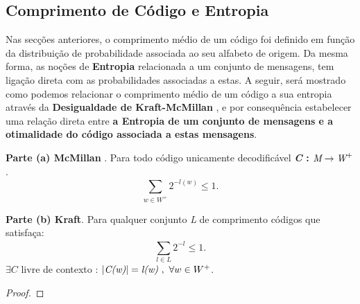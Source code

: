 \subsection{Comprimento de Código e Entropia}
Nas secções anteriores, o comprimento médio de um código  foi definido em função da distribuição de probabilidade associada ao seu alfabeto de origem.
Da mesma forma, as noções de \textbf{Entropia} relacionada a um conjunto de mensagens, tem ligação direta com as probabilidades associadas a estas. 
A seguir, será mostrado como podemos relacionar o comprimento médio de um código a sua entropia através da \textbf{Desigualdade de Kraft-McMillan} , e por consequência estabelecer uma relação direta entre \textbf{a Entropia de um conjunto de mensagens e a otimalidade do código associada a estas mensagens}.

\begin{lemma}  \textbf{Parte (a) McMillan} . Para todo código unicamente decodificável \textbf{\emph{C} : $\emph{M} \rightarrow \emph{W}^+$} .
\begin{equation*}
\sum_{w \in W^+}^{}2^{-l(w)} \leq 1.
\end{equation*}

\textbf{Parte (b) Kraft}. Para qualquer conjunto \emph{L} de comprimento códigos que satisfaça:
\begin{equation*}
\sum_{l \in L}^{} 2^{-l} \leq 1.
\end{equation*}
$\exists C$ livre de contexto : $ |\emph{C(w)}| =  \emph{l(w)} ~,~\forall w \in W^+$.

\begin{proof}
\end{proof}
\end{lemma}

